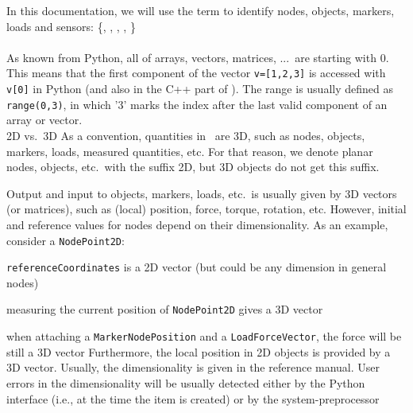 In this documentation, we will use the term  to identify nodes, objects, markers, loads and sensors:
\be
   \in \{, , , ,  \}
\ee
\vspace{12pt}\\
 \vspace{6pt}\\
As known from Python, all  of arrays, vectors, matrices, ...\ are starting with 0. This means that the first component of the vector \texttt{v=[1,2,3]} is accessed with \texttt{v[0]} in Python (and also in the C++ part of \codeName ). The range is usually defined as \texttt{range(0,3)}, in which '3' marks the index after the last valid component of an array or vector.
\ignoreRST{\vspace{12pt}\\}
%
 \ignoreRST{\vspace{6pt}}\\ 
\ac{2D} vs.\ \ac{3D}
\ignoreRST{\vspace{6pt}\\}
As a convention, quantities in \codeName\ are 3D, such as nodes, objects, markers, loads, measured quantities, etc. 
For that reason, we denote planar nodes, objects, etc.\ with the suffix 2D, but 3D objects do not get this suffix.

Output and input to objects, markers, loads, etc.\ is usually given by 3D vectors (or matrices), such as (local) position, force, torque, rotation, etc. However, initial and reference values for nodes depend on their dimensionality.
As an example, consider a \texttt{NodePoint2D}:
\bi
  \item \texttt{referenceCoordinates} is a 2D vector (but could be any dimension in general nodes)
  \item measuring the current position of \texttt{NodePoint2D} gives a 3D vector
  \item when attaching a \texttt{MarkerNodePosition} and a \texttt{LoadForceVector}, the force will be still a 3D vector
\ei
Furthermore, the local position in 2D objects is provided by a 3D vector. Usually, the dimensionality is given in the reference manual. User errors in the dimensionality will be usually detected either by the Python interface (i.e., at the time the item is created) or by the system-preprocessor

